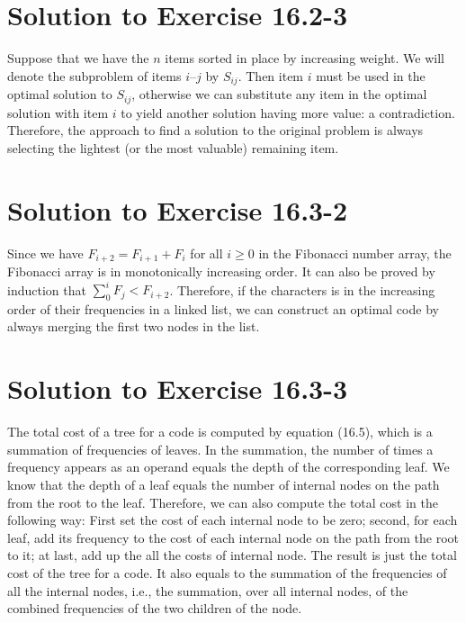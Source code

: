 \documentclass[fleqn]{article}
\begin{document}
\section*{Solution to Exercise 16.2-3}

Suppose that we have the $n$ items sorted in place by increasing
weight. We will denote the subproblem of items $i$--$j$ by $S_{ij}$.
Then item $i$ must be used in the optimal solution to $S_{ij}$,
otherwise we can substitute any item in the optimal solution with item
$i$ to yield another solution having more value: a contradiction.
Therefore, the approach to find a solution to the original problem is
always selecting the lightest (or the most valuable) remaining item.






\section*{Solution to Exercise 16.3-2}

Since we have $F_{i+2} = F_{i+1} + F_i$ for all $i \geq 0$ in the
Fibonacci number array, the Fibonacci array is in monotonically
increasing order. It can also be proved by induction that $\sum_0^i
F_j < F_{i+2}$. Therefore, if the characters is in the increasing
order of their frequencies in a linked list, we can construct an
optimal code by always merging the first two nodes in the list.






\section*{Solution to Exercise 16.3-3}

The total cost of a tree for a code is computed by equation (16.5),
which is a summation of frequencies of leaves. In the summation, the
number of times a frequency appears as an operand equals the depth of
the corresponding leaf. We know that the depth of a leaf equals the
number of internal nodes on the path from the root to the leaf.
Therefore, we can also compute the total cost in the following way:
First set the cost of each internal node to be zero; second, for each
leaf, add its frequency to the cost of each internal node on the path
from the root to it; at last, add up the all the costs of internal
node. The result is just the total cost of the tree for a code. It
also equals to the summation of the frequencies of all the internal
nodes, i.e., the summation, over all internal nodes, of the combined
frequencies of the two children of the node.
\end{document}
